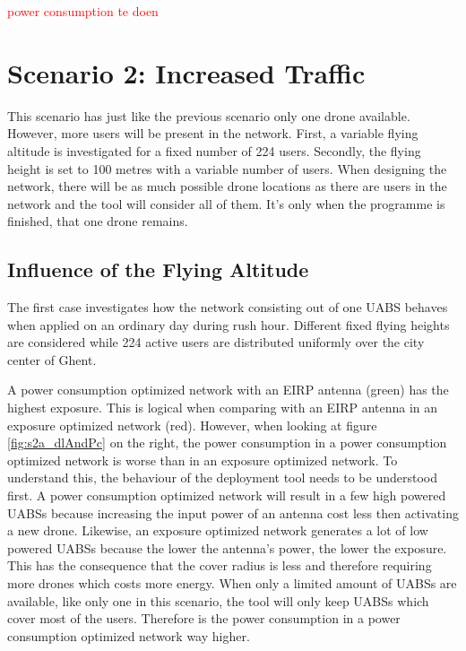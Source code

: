 \textcolor{red}{power consumption te doen}
\FloatBarrier
\section{Scenario 2: Increased Traffic}

This scenario has just like the previous scenario only one drone available. However, more users will be present in the network.
First, a variable flying altitude is investigated for a fixed number of 224 users. 
Secondly, the flying height is set to 100 metres with a variable number of users.
When designing the network, there will be as much possible drone locations as there are users in the network and the tool
will consider all of them. It's only when the programme is finished, that one drone remains.

\subsection{Influence of the Flying Altitude}
The first case investigates how the network consisting out of one \gls{UABS} behaves when applied on an ordinary day during rush hour. 
Different fixed flying heights are considered while 224 active users are distributed uniformly over the city center of Ghent. 

A power consumption optimized network with an \gls{EIRP} antenna (green) has the highest exposure. 
This is logical when comparing with an EIRP antenna in an exposure optimized network (red). 
However, when looking at figure \ref{fig:s2a_dlAndPc} on the right, the power consumption in a power consumption optimized network is worse 
than in an exposure optimized network. To understand this, the behaviour of the deployment tool needs to be understood first. 
A power consumption optimized network will result in a few high powered \gls{UABS}s because increasing the input power of an antenna cost 
less then activating a new  drone. Likewise, an exposure optimized network 
generates a lot of low powered \gls{UABS}s because the lower the antenna's power, the lower the exposure. This has the consequence that the cover radius 
is less and therefore requiring more drones which costs more energy.
When only a limited amount of \gls{UABS}s are available, 
like only one in this scenario, the tool will only keep \gls{UABS}s which cover most of the users. 
Therefore is the power consumption in a power consumption optimized network way higher. 


